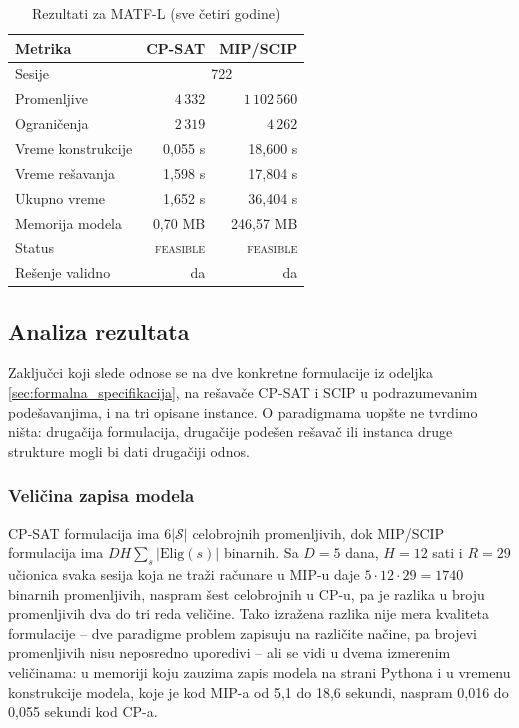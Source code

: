 \documentclass[12pt,oneside]{memoir}
\begin{document}
\begin{table}[ht]
\centering
\caption{Rezultati za MATF-L (sve četiri godine)}
\label{tbl:results_l}
\begin{tabular}{lrr}
\toprule
\textbf{Metrika} & \textbf{CP-SAT} & \textbf{MIP/SCIP} \\
\midrule
Sesije                 & \multicolumn{2}{c}{722} \\
Promenljive            & $4\,332$        & $1\,102\,560$ \\
Ograničenja            & $2\,319$        & $4\,262$ \\
Vreme konstrukcije     & 0,055 s         & 18,600 s \\
Vreme rešavanja        & 1,598 s         & 17,804 s \\
Ukupno vreme           & 1,652 s         & 36,404 s \\
Memorija modela        & 0,70 MB         & 246,57 MB \\
Status                 & \textsc{feasible} & \textsc{feasible} \\
Rešenje validno        & da              & da \\
\bottomrule
\end{tabular}
\end{table}

\subsection{Analiza rezultata}
\label{sec:analiza}

Zaključci koji slede odnose se na dve konkretne formulacije iz odeljka
\ref{sec:formalna_specifikacija}, na rešavače CP-SAT i SCIP u
podrazumevanim podešavanjima, i na tri opisane instance. O paradigmama
uopšte ne tvrdimo ništa: drugačija formulacija, drugačije podešen
rešavač ili instanca druge strukture mogli bi dati drugačiji odnos.

\subsubsection{Veličina zapisa modela}

CP-SAT formulacija ima $6|\mathcal{S}|$ celobrojnih promenljivih, dok
MIP/SCIP formulacija ima $D H \sum_s |\text{Elig}(s)|$ binarnih. Sa
$D=5$ dana, $H=12$ sati i $R=29$ učionica svaka sesija koja ne traži
računare u MIP-u daje $5 \cdot 12 \cdot 29 = 1740$ binarnih
promenljivih, naspram šest celobrojnih u CP-u, pa je razlika u broju
promenljivih dva do tri reda veličine. Tako izražena razlika nije mera
kvaliteta formulacije -- dve paradigme problem zapisuju na različite
načine, pa brojevi promenljivih nisu neposredno uporedivi -- ali se
vidi u dvema izmerenim veličinama: u memoriji koju zauzima zapis
modela na strani Pythona i u vremenu konstrukcije modela, koje je kod
MIP-a od 5,1 do 18,6 sekundi, naspram 0,016 do 0,055 sekundi kod
CP-a.
\end{document}
